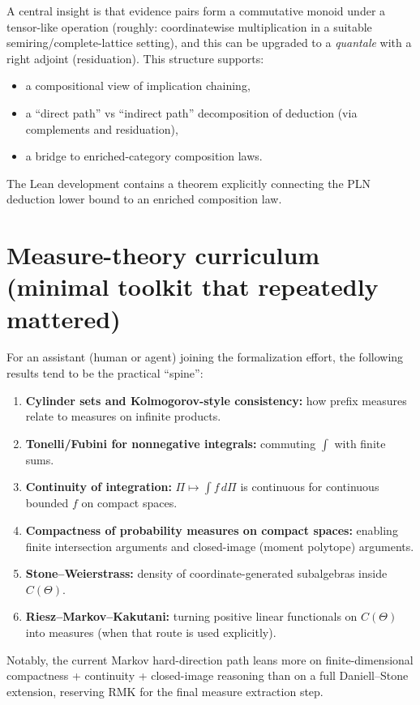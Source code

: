 \documentclass[11pt]{article}
\newcommand{\1}{\mathbf{1}}
\begin{document}
A central insight is that evidence pairs form a commutative monoid under a tensor-like operation (roughly: coordinatewise multiplication in a suitable semiring/complete-lattice setting), and this can be upgraded to a \emph{quantale} with a right adjoint (residuation).
This structure supports:

\begin{itemize}[leftmargin=2em]
\item a compositional view of implication chaining,
\item a ``direct path'' vs ``indirect path'' decomposition of deduction (via complements and residuation),
\item a bridge to enriched-category composition laws.
\end{itemize}

The Lean development contains a theorem explicitly connecting the PLN deduction lower bound to an enriched composition law.

\section{Measure-theory curriculum (minimal toolkit that repeatedly mattered)}

For an assistant (human or agent) joining the formalization effort, the following results tend to be the practical ``spine'':

\begin{enumerate}[leftmargin=2em]
\item \textbf{Cylinder sets and Kolmogorov-style consistency:} how prefix measures relate to measures on infinite products.
\item \textbf{Tonelli/Fubini for nonnegative integrals:} commuting $\int$ with finite sums.
\item \textbf{Continuity of integration:} $\Pi\mapsto \int f\,d\Pi$ is continuous for continuous bounded $f$ on compact spaces.
\item \textbf{Compactness of probability measures on compact spaces:} enabling finite intersection arguments and closed-image (moment polytope) arguments.
\item \textbf{Stone--Weierstrass:} density of coordinate-generated subalgebras inside $C(\Theta)$.
\item \textbf{Riesz--Markov--Kakutani:} turning positive linear functionals on $C(\Theta)$ into measures (when that route is used explicitly).
\end{enumerate}

Notably, the current Markov hard-direction path leans more on finite-dimensional compactness + continuity + closed-image reasoning than on a full Daniell--Stone extension, reserving RMK for the final measure extraction step.
\end{document}
